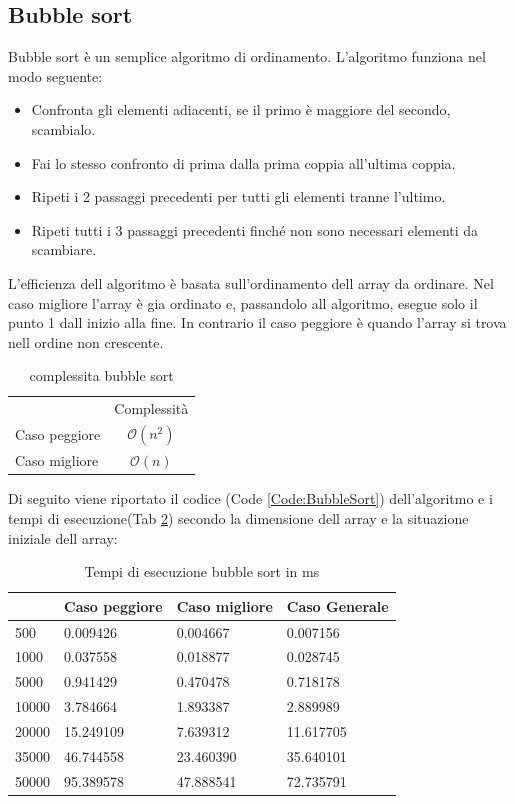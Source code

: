 \documentclass[12pt, a4paper]{report}
\begin{document}
\subsection{Bubble sort}
Bubble sort è un semplice algoritmo di ordinamento. 
L'algoritmo funziona nel modo seguente:
\begin{itemize}
	\item Confronta gli elementi adiacenti, se il primo è maggiore del secondo, scambialo.
	\item Fai lo stesso confronto di prima dalla prima coppia all'ultima coppia. 
	\item Ripeti i 2 passaggi precedenti per tutti gli elementi tranne l'ultimo.
	\item Ripeti tutti i 3 passaggi precedenti finché non sono necessari elementi da scambiare.
\end{itemize}
L'efficienza dell algoritmo è basata sull'ordinamento dell array da ordinare. Nel caso migliore l'array è gia ordinato e, passandolo all algoritmo, esegue solo il punto 1 dall inizio alla fine. In contrario il caso peggiore è quando l'array si trova nell ordine non crescente.
\begin{table}[ht]
	\centering
	\begin{tabular}{lc}
 & Complessità \\
Caso peggiore & $ \mathcal{O}(n^2)$ \\
Caso migliore & $ \mathcal{O}(n)$ \\
\end{tabular}
	\caption{complessita bubble sort}
	\label{Tab:CompBubbleSort}
\end{table}

Di seguito viene riportato il codice (Code \ref{Code:BubbleSort}) dell'algoritmo e i tempi di esecuzione(Tab \ref{Tab:Tempi esecuzione Bubblesort}) secondo la dimensione dell array e la situazione iniziale dell array:
	

\begin{table}[ht]
\centering
\begin{tabular}{| l | l | l | l |}
\hline
 & Caso peggiore & Caso migliore & Caso Generale \\ \hline
500 & 0.009426 & 0.004667 & 0.007156 \\ \hline
1000 & 0.037558 & 0.018877 & 0.028745 \\ \hline
5000 & 0.941429 & 0.470478 & 0.718178 \\ \hline
10000 & 3.784664 & 1.893387 & 2.889989 \\ \hline
20000 & 15.249109 & 7.639312 & 11.617705 \\ \hline
35000 & 46.744558 & 23.460390 & 35.640101 \\ \hline
50000 & 95.389578 & 47.888541 & 72.735791 \\ \hline
\end{tabular}
\caption{Tempi di esecuzione bubble sort in ms}
\label{Tab:Tempi esecuzione Bubblesort}
\end{table}
\end{document}
